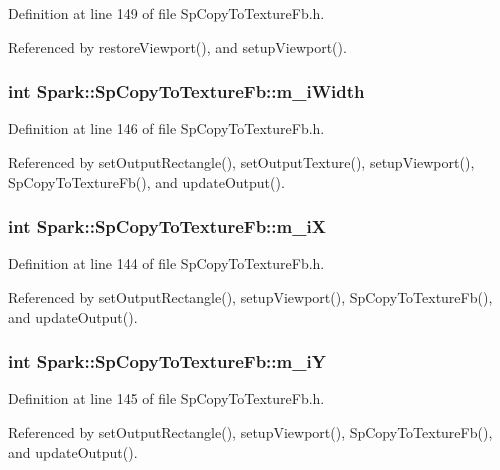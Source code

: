 Definition at line 149 of file Sp\-Copy\-To\-Texture\-Fb.h.

Referenced by restore\-Viewport(), and setup\-Viewport().
\subsubsection{\setlength{\rightskip}{0pt plus 5cm}int {\bf Spark::Sp\-Copy\-To\-Texture\-Fb::m\_\-i\-Width}\hspace{0.3cm}{\tt  [protected]}}\label{classSpark_1_1SpCopyToTextureFb_p6}


Definition at line 146 of file Sp\-Copy\-To\-Texture\-Fb.h.

Referenced by set\-Output\-Rectangle(), set\-Output\-Texture(), setup\-Viewport(), Sp\-Copy\-To\-Texture\-Fb(), and update\-Output().
\subsubsection{\setlength{\rightskip}{0pt plus 5cm}int {\bf Spark::Sp\-Copy\-To\-Texture\-Fb::m\_\-i\-X}\hspace{0.3cm}{\tt  [protected]}}\label{classSpark_1_1SpCopyToTextureFb_p4}


Definition at line 144 of file Sp\-Copy\-To\-Texture\-Fb.h.

Referenced by set\-Output\-Rectangle(), setup\-Viewport(), Sp\-Copy\-To\-Texture\-Fb(), and update\-Output().
\subsubsection{\setlength{\rightskip}{0pt plus 5cm}int {\bf Spark::Sp\-Copy\-To\-Texture\-Fb::m\_\-i\-Y}\hspace{0.3cm}{\tt  [protected]}}\label{classSpark_1_1SpCopyToTextureFb_p5}


Definition at line 145 of file Sp\-Copy\-To\-Texture\-Fb.h.

Referenced by set\-Output\-Rectangle(), setup\-Viewport(), Sp\-Copy\-To\-Texture\-Fb(), and update\-Output().
